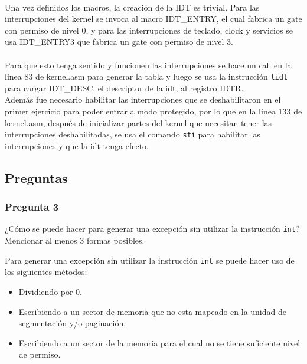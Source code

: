 \documentclass[10pt, a4paper]{article}
\begin{document}
\\
Una vez definidos los macros, la creación de la IDT es trivial. Para las interrupciones del kernel se invoca al macro IDT\_ENTRY, el cual fabrica un gate con permiso de nivel 0, y para las interrupciones de teclado, clock y servicios se usa IDT\_ENTRY3 que fabrica un gate con permiso de nivel 3.
\\\\
Para que esto tenga sentido y funcionen las interrupciones se hace un call en la linea 83 de kernel.asm para generar la tabla y luego se usa la instrucción \texttt{lidt} para cargar IDT\_DESC, el descriptor de la idt, al registro IDTR.\\
Además fue necesario habilitar las interrupciones que se deshabilitaron en el primer ejercicio para poder entrar a modo protegido, por lo que en la linea 133 de kernel.asm, después de inicializar partes del kernel que necesitan tener las interrupciones deshabilitadas, se usa el comando \texttt{sti} para habilitar las interrupciones y que la idt tenga efecto.
\subsection{Preguntas}
\subsubsection*{Pregunta 3}
 \begin{framed}
¿Cómo se puede hacer para generar una excepción sin utilizar la instrucción \texttt{int}? Mencionar al menos 3 formas posibles.
\end{framed}
Para generar una excepción sin utilizar la instrucción \texttt{int} se puede hacer uso de los siguientes métodos:
\begin{itemize}
	\item Dividiendo por 0.
	\item Escribiendo a un sector de memoria que no esta mapeado en la unidad de segmentación y/o paginación.
	\item Escribiendo a un sector de la memoria para el cual no se tiene suficiente nivel de permiso.
\end{itemize}
\end{document}
